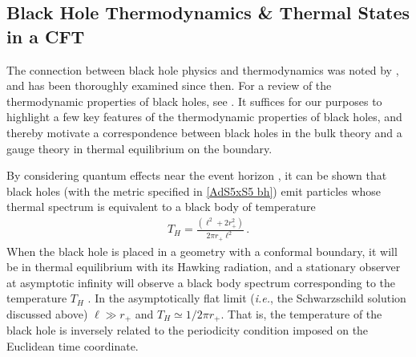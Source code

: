 \documentclass[../PhD.tex]{subfiles}
\begin{document}

\subsection{Black Hole Thermodynamics \& Thermal States in a CFT}
\label{sub: bh thermo}

The connection between black hole physics and thermodynamics was noted by \cite{Bekenstein:1973ur}, and has been thoroughly examined since then. For a review of the thermodynamic properties of black holes, see \cite{Jacobson1996, Bardeen:1973gs, Hawking:1982dh}. It suffices for our purposes to highlight a few key features of the thermodynamic properties of black holes, and thereby motivate a correspondence between black holes in the bulk theory and a gauge theory in thermal equilibrium on the boundary.

By considering quantum effects near the event horizon \cite{Hawking:1974rv}, it can be shown that black holes (with the metric specified in  \eqref{AdS5xS5 bh}) emit particles whose thermal spectrum is equivalent to a black body of temperature \cite{Hawking:1974sw}
\begin{align}
\label{hawking temp}
T_H = \frac{(\ell^2 + 2r_+^2)}{2 \pi r_+ \ell^2} \, .
\end{align}
When the black hole is placed in a geometry with a conformal boundary, it will be in thermal equilibrium with its Hawking radiation, and a stationary observer at asymptotic infinity will observe a black body spectrum corresponding to the temperature $T_H$ \cite{Carroll:2004st}. In the asymptotically flat limit ({\it i.e.}, the Schwarzschild solution discussed above) $\ell \gg r_+$ and $T_H \simeq 1/2\pi r_+$. That is, the temperature of the black hole is inversely related to the periodicity condition imposed on the Euclidean time coordinate.
\end{document}
